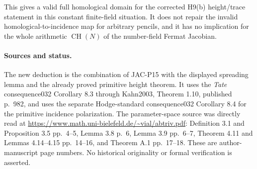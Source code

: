 This gives a valid full homological domain for the corrected H9(b)
height/trace statement in this constant finite-field situation. It
does not repair the invalid homological-to-incidence map for arbitrary
pencils, and it has no implication for the whole arithmetic
$\operatorname{CH}(N)$ of the number-field Fermat Jacobian.

\paragraph{Sources and status.}
The new deduction is the combination of JAC-P15 with the displayed
spreading lemma and the already proved primitive height theorem.
It uses the \emph{Tate} consequence032 Corollary 8.3 through
Kahn2003, Theorem 1.10, published p.~982, and uses the separate
Hodge-standard consequence032 Corollary 8.4 for the primitive
incidence polarization. The parameter-space source was directly read
at \url{https://www.math.uni-bielefeld.de/~vial/abtriv.pdf}:
Definition 3.1 and Proposition 3.5 pp.~4--5, Lemma 3.8 p.~6,
Lemma 3.9 pp.~6--7, Theorem 4.11 and Lemmas 4.14--4.15 pp.~14--16,
and Theorem A.1 pp.~17--18. These are author-manuscript page numbers.
No historical originality or formal verification is asserted.
